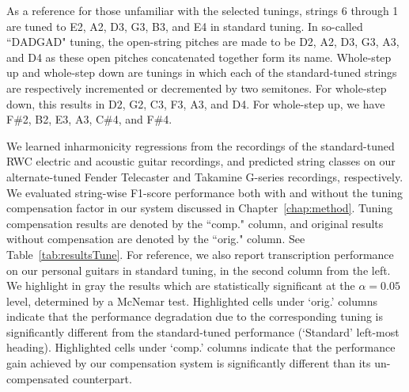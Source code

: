 \documentclass[12pt]{cmuthesis}
\begin{document}
As a reference for those unfamiliar with the selected tunings, strings 6 through 1 are tuned to E2, A2, D3, G3, B3, and E4 in standard tuning. In so-called ``DADGAD" tuning, the open-string pitches are made to be D2, A2, D3, G3, A3, and D4 as these open pitches concatenated together form its name. Whole-step up and whole-step down are tunings in which each of the standard-tuned strings are respectively incremented or decremented by two semitones. For whole-step down, this results in D2, G2, C3, F3, A3, and D4. For whole-step up, we have F\#2, B2, E3, A3, C\#4, and F\#4.

We learned inharmonicity regressions from the recordings of the standard-tuned RWC electric and acoustic guitar recordings, and predicted string classes on our alternate-tuned Fender Telecaster and Takamine G-series recordings, respectively. We evaluated string-wise F1-score performance both with and without the tuning compensation factor in our system discussed in Chapter~\ref{chap:method}. Tuning compensation results are denoted by the ``comp." column, and original results without compensation are denoted by the ``orig." column. See Table~\ref{tab:resultsTune}. For reference, we also report transcription performance on our personal guitars in standard tuning, in the second column from the left. We highlight in gray the results which are statistically significant at the $\alpha = 0.05$ level, determined by a McNemar test. Highlighted cells under `orig.' columns indicate that the performance degradation due to the corresponding tuning is significantly different from the standard-tuned performance (`Standard' left-most heading). Highlighted cells under `comp.' columns indicate that the performance gain achieved by our compensation system is significantly different than its un-compensated counterpart.
\end{document}
